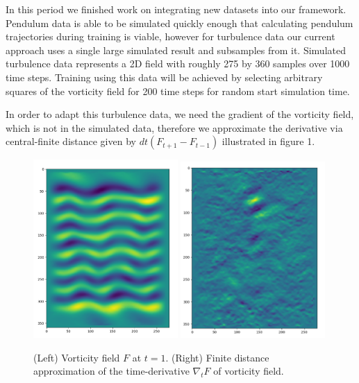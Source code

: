\documentclass[10pt,letterpaper]{report}
\author{Brandon Houghton}
\begin{document}
In this period we finished work on integrating new datasets into our framework. Pendulum data is able to be simulated quickly enough that calculating pendulum trajectories during training is viable, however for turbulence data our current approach uses a single large simulated result and subsamples from it. Simulated turbulence data represents a 2D field with roughly 275 by 360 samples over 1000 time steps. Training using this data will be achieved by selecting arbitrary squares of the vorticity field for 200 time steps for random start simulation time. 

In order to adapt this turbulence data, we need the gradient of the vorticity field, which is not in the simulated data, therefore we approximate the derivative via central-finite distance given by $ dt(F_{t+1} - F_{t-1}) $ illustrated in figure 1.

\begin{figure}
\begin{center}
	\includegraphics[width=0.49\textwidth]{vortex.png}
	\includegraphics[width=0.49\textwidth]{vortex_der.png}
	\caption{\small (Left) Vorticity field $F$ at $t=1$. (Right)  Finite distance approximation of the time-derivative $\nabla_t F$ of vorticity field. }
\end{center}	
\end{figure}
\end{document}
